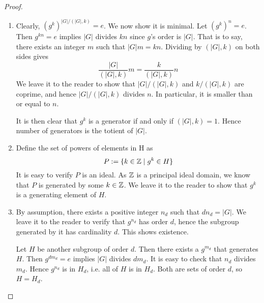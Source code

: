\documentclass[../../book.tex]{subfiles}
\begin{document}
\begin{proof}
    \begin{enumerate}
        \item Clearly, $(g^k)^{|G|/(|G|,k)} = e$. 
        We now show it is minimal. 
        Let $(g^k)^n = e$. 
        Then $g^{kn} = e$ implies $|G|$ divides $kn$ since $g$'s order is $|G|$. 
        That is to say, there exists an integer $m$ such that $|G| m = k n$. 
        Dividing by $(|G|,k)$ on both sides gives \[
            \frac{|G|}{(|G|,k)} m = \frac{k}{(|G|,k)} n
        \]
        We leave it to the reader to show that 
        $|G| / (|G|,k)$ and $k / (|G|, k)$ are coprime, 
        and hence $|G| / (|G|,k)$ divides $n$. 
        In particular, it is smaller than or equal to $n$.
        
        It is then clear that $g^k$ is a generator if and only if $(|G|,k) = 1$.
        Hence number of generators is the totient of $|G|$. 
        
        \item 
    
        Define the set of powers of elements in H as
        \[ P:=\{k \in \mathbb{Z} \mid g^k \in H\} \]
        It is easy to verify $P$ is an ideal.
        As $\mathbb{Z}$ is a principal ideal domain,
        we know that $P$ is generated by some $k \in \mathbb{Z}$.
        We leave it to the reader to show that $g^k$ is a generating element of $H$.
        
        \item By assumption, there exists a positive integer $n_d$ such that $d n_d = |G|$.
        We leave it to the reader to verify that $g^{n_d}$ has order $d$,
        hence the subgroup generated by it has cardinality $d$. 
        This shows existence. 
        
        Let $H$ be another subgroup of order $d$. 
        Then there exists a $g^{m_d}$ that generates $H$. 
        Then $g^{dm_d} = e$ implies $|G|$ divides $dm_d$. 
        It is easy to check that $n_d$ divides $m_d$.
        Hence $g^{n_d}$ is in $H_d$, i.e. all of $H$ is in $H_d$. 
        Both are sets of order $d$, so $H = H_d$.
        

\end{enumerate}
\end{proof}
\end{document}
